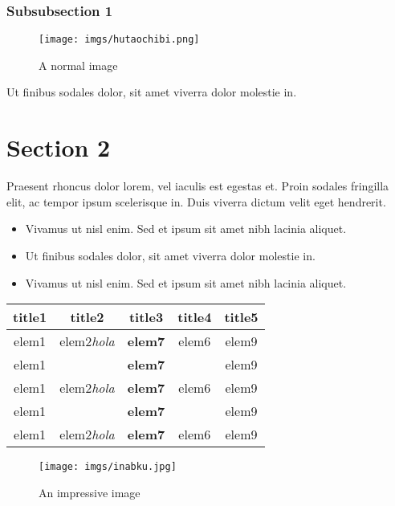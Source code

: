 \documentclass{article}
\begin{document}
\subsubsection{ Subsubsection 1}

\begin{figure}[h]
\caption{A normal image}
\centering
\texttt{[image: imgs/hutaochibi.png]}
\end{figure}

Ut finibus sodales dolor, sit amet viverra dolor molestie in.

\section{ Section 2}

Praesent rhoncus dolor lorem, vel iaculis est egestas et. Proin sodales fringilla elit,
ac tempor ipsum scelerisque in. Duis viverra dictum velit eget hendrerit. 

\begin{itemize}
\item Vivamus ut nisl enim. Sed et ipsum sit amet nibh lacinia aliquet.
\item Ut finibus sodales dolor, sit amet viverra dolor molestie in.
\item Vivamus ut nisl enim. Sed et ipsum sit amet nibh lacinia aliquet.
\end{itemize}

\begin{table}[h!]
\centering
\begin{tabular}{||c c c c c||}
\hline
title1 & title2 & title3 & title4 & title5\\
\hline\hline
 elem1  &  elem2\textit{hola}  &  \textbf{elem7}  &  elem6  &  elem9\\
 elem1  &    &  \textbf{elem7}  &    &  elem9\\
 elem1  &  elem2\textit{hola}  &  \textbf{elem7}  &  elem6  &  elem9\\
 elem1  &    &  \textbf{elem7}  &    &  elem9\\
 elem1  &  elem2\textit{hola}  &  \textbf{elem7}  &  elem6  &  elem9\\
\hline
\end{tabular}
\end{table}

\begin{figure}[h]
\caption{An impressive image}
\centering
\texttt{[image: imgs/inabku.jpg]}
\end{figure}
\end{document}
